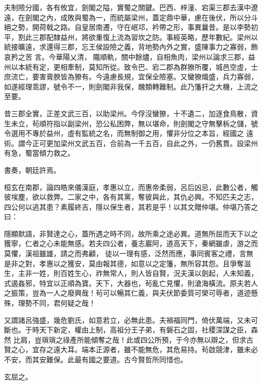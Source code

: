 \begin{pinyinscope}
 夫制險分國，各有攸宜，劍閣之隘，實蜀之關鍵。巴西、梓潼、宕渠三郡去漢中遼遠，在劍閣之內，成敗與蜀為一，而統屬梁州，蓋定鼎中華，慮在後伏，所以分斗絕之勢，開荷戟之路。自皇居南遷，守在岷邛，衿帶之形，事異曩昔。是以李勢初平，割此三郡配隸益州，將欲重復上流為習坎之防。事經英略，歷年數紀。梁州以統接曠遠，求還得三郡，忘王侯設險之義，背地勢內外之實，盛陳事力之寡弱，飾哀矜之苦
 言。今華陽乂清，隴順軌，關中餘燼，自相魚肉，梁州以論求三郡，益州以本統有定，更相牽制，莫知所從。致令巴、宕二郡為群獠所覆，城邑空虛，士庶流亡，要害膏腴皆為獠有。今遠慮長規，宜保全險塞。又蠻獠熾盛，兵力寡弱，如遂經理乖謬，號令不一，則劍閣非我保，醜類轉難制。此乃籓扞之大機，上流之至要。



 昔三郡全實，正差文武三百，以助梁州。今俘沒蠻獠，十不遺二，加逐食鳥散，資生未立，茍順符指以副梁州，恐公私困弊，無以堪命，則劍閣之守無擊柝之儲，號令選用不專於益州，虛有監統之名，而無制御之用，懼非分位之本旨，經國之
 遠術。謂今正可更加梁州文武五百，合前為一千五百，自此之外，一仍舊貫。設梁州有急，蜀當傾力救之。



 書奏，朝廷許焉。



 桓玄在南郡，論四皓來儀漢庭，孝惠以立，而惠帝柔弱，呂后凶忌，此數公者，觸彼埃塵，欲以救弊。二家之中，各有其黨，奪彼與此，其仇必興。不知匹夫之志，四公何以逃其患？素履終吉，隱以保生者，其若是乎！以其文贈仲堪。仲堪乃答之曰：



 隱顯默語，非賢達之心，蓋所遇之時不同，故所乘之途必異。道無所屈而天下以之獲寧，仁者之心未能無感。若夫四公者，養志巖阿，道高天下，秦網雖虐，游之而莫懼，漢祖雖雄，請之而弗顧，
 徒以一理有感，泛然而應，事同賓客之禮，言無是非之對，孝惠以之獲安，莫由報其德，如意以之定籓，無所容其怨。且爭奪滋生，主非一姓，則百姓生心，祚無常人，則人皆自賢，況夫漢以劍起，人未知義，式遏姦邪，特宜以正順為寶。天下，大器也，茍亂亡見懼，則滄海橫流。原夫若人之振策，豈為一人之廢興哉！茍可以暢其仁義，與夫伏節委質可榮可辱者，道迹懸殊，理勢不同，君何疑之哉！



 又謂諸呂強盛，幾危劉氏，如意若立，必無此患。夫禍福同門，倚伏萬端，又未可斷也。于時天下新定，權由上制，高祖分王子弟，有磐石之固，社稷深謀之臣，森然
 比肩，豈瑣瑣之祿產所能傾奪之哉！此或四公所預，于今亦無以辯之，但求古賢之心，宜存之遠大耳。端本正源者，雖不能無危，其危易持。茍啟競津，雖未必不安，而其安難保。此最有國之要道。古今賢哲所同惜也。



 玄屈之。




\end{pinyinscope}
